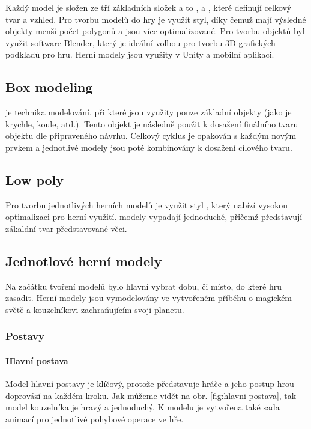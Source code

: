 Každý model je složen ze tří základních složek a to ,  a , které definují celkový tvar a vzhled. Pro tvorbu modelů do hry je využit \cite{LowPoly} styl, díky čemuž mají výsledné objekty menší počet polygonů a jsou více optimalizované. Pro tvorbu objektů byl využit software Blender, který je ideální volbou pro tvorbu 3D grafických podkladů pro hru. Herní modely jsou využity v Unity a mobilní aplikaci.

\subsection{Box modeling}
\cite{BoxModeling} je technika modelování, při které jsou využity pouze základní objekty (jako je krychle, koule, atd.). Tento objekt je následně použit k dosažení finálního tvaru objektu dle připraveného návrhu. Celkový cyklus je opakován s každým novým prvkem a jednotlivé modely jsou poté kombinovány k dosažení cílového tvaru.

\subsection{Low poly}
Pro tvorbu jednotlivých herních modelů je využit styl \cite{LowPoly}, který nabízí vysokou optimalizaci pro herní využití.  modely vypadají jednoduché, přičemž představují zákaldní tvar představované věci.

\subsection{Jednotlové herní modely}
Na začátku tvoření modelů bylo hlavní vybrat dobu, či místo, do které hru zasadit. Herní modely jsou vymodelovány ve vytvořeném příběhu o magickém světě a kouzelníkovi zachraňujícím svoji planetu.

\subsubsection{Postavy}
\paragraph{Hlavní postava}
Model hlavní postavy je klíčový, protože představuje hráče a jeho postup hrou doprovází na každém kroku. Jak můžeme vidět na obr. \ref{fig:hlavni-postava}, tak model kouzelníka je hravý a jednoduchý. K modelu je vytvořena také sada animací pro jednotlivé pohybové operace ve hře.

